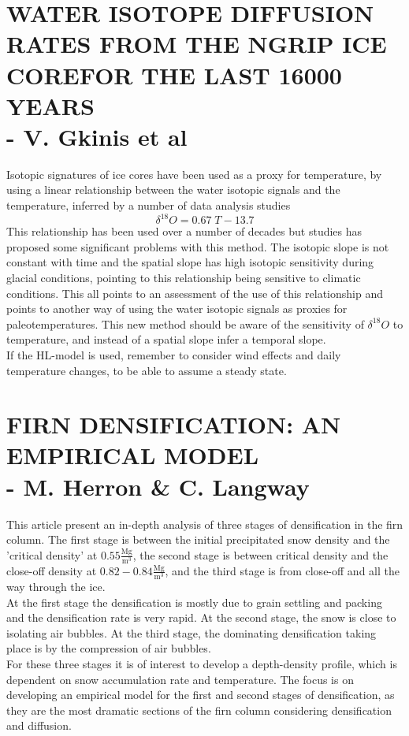 \documentclass[11pt]{article}
\begin{document}
\newpage
\section{WATER ISOTOPE DIFFUSION RATES FROM THE NGRIP ICE COREFOR THE LAST 16000 YEARS \\ - V. Gkinis et al}
Isotopic signatures of ice cores have been used as a proxy for temperature, by using a linear relationship between the water isotopic signals and the temperature, inferred by a number of data analysis studies
\begin{equation}
	\delta^{18}O = 0.67 \; T - 13.7
	\label{eq:Iso_Temp_spatial_relation}
\end{equation}
This relationship has been used over a number of decades but studies has proposed some significant problems with this method. The isotopic slope is not constant with time and the spatial slope has high isotopic sensitivity during glacial conditions, pointing to this relationship being sensitive to climatic conditions.
This all points to an assessment of the use of this relationship and points to another way of using the water isotopic signals as proxies for paleotemperatures. This new method should be aware of the sensitivity of $\delta^{18}O$  to temperature, and instead of a spatial slope infer a temporal slope. \\

If the HL-model is used, remember to consider wind effects and daily temperature changes, to be able to assume a steady state.

\newpage
\section{FIRN DENSIFICATION: AN EMPIRICAL MODEL \\ - M. Herron \& C. Langway}
This article present an in-depth analysis of three stages of densification in the firn column. The first stage is between the initial precipitated snow density and the 'critical density' at $0.55 \frac{\text{Mg}}{\text{m}^3}$, the second stage is between critical density and the close-off density at $0.82-0.84 \frac{\text{Mg}}{\text{m}^3}$, and the third stage is from close-off and all the way through the ice.\\
At the first stage the densification is mostly due to grain settling and packing and the densification rate is very rapid. At the second stage, the snow is close to isolating air bubbles. At the third stage, the dominating densification taking place is by the compression of air bubbles.\\
For these three stages it is of interest to develop a depth-density profile, which is dependent on snow accumulation rate and temperature. The focus is on developing an empirical model for the first and second stages of densification, as they are the most dramatic sections of the firn column considering densification and diffusion.
\end{document}
